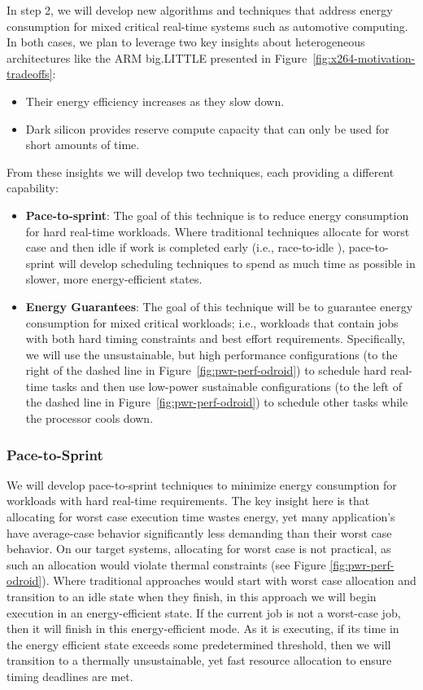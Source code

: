 In step 2, we will develop new algorithms and techniques that address
energy consumption for mixed critical real-time systems such as
automotive computing.  In both cases, we plan to leverage two key
insights about heterogeneous architectures like the ARM big.LITTLE
presented in Figure~\ref{fig:x264-motivation-tradeoffs}:
\begin{itemize}\itemsep 0pt \parskip 0pt
\item Their energy efficiency increases as they slow down.
\item Dark silicon provides reserve compute capacity that can only be
  used for short amounts of time.
\end{itemize}

From these insights we will develop two techniques, each providing a
different capability:
\begin{itemize}\itemsep 0pt \parskip 0pt
\item \textbf{Pace-to-sprint}: The goal of this technique is to reduce
  energy consumption for hard real-time workloads.  Where traditional
  techniques allocate for worst case and then idle if work is
  completed early (i.e., race-to-idle
  \cite{Carroll13,LeSueur11,Imes2014,HotPower}), pace-to-sprint will
  develop scheduling techniques to spend as much time as possible in
  slower, more energy-efficient states.
\item \textbf{Energy Guarantees}: The goal of this technique will be
  to guarantee energy consumption for mixed critical workloads; i.e.,
  workloads that contain jobs with both hard timing constraints and
  best effort requirements.  Specifically, we will use the
  unsustainable, but high performance configurations (to the right of
  the dashed line in Figure~\ref{fig:pwr-perf-odroid}) to schedule hard
  real-time tasks and then use low-power sustainable configurations
  (to the left of the dashed line in Figure~\ref{fig:pwr-perf-odroid}) to
  schedule other tasks while the processor cools down. 
\end{itemize}


\subsubsection{Pace-to-Sprint}
We will develop pace-to-sprint techniques to minimize energy
consumption for workloads with hard real-time requirements.  The key
insight here is that allocating for worst case execution time wastes
energy, yet many application's have average-case behavior
significantly less demanding than their worst case behavior.  On our
target systems, allocating for worst case is not practical, as such an
allocation would violate thermal constraints (see Figure
\ref{fig:pwr-perf-odroid}).  Where traditional approaches would start with
worst case allocation and transition to an idle state when they
finish, in this approach we will begin execution in an
energy-efficient state.  If the current job is not a worst-case job,
then it will finish in this energy-efficient mode.  As it is
executing, if its time in the energy efficient state exceeds some
predetermined threshold, then we will transition to a thermally
unsustainable, yet fast resource allocation to ensure timing deadlines
are met.

